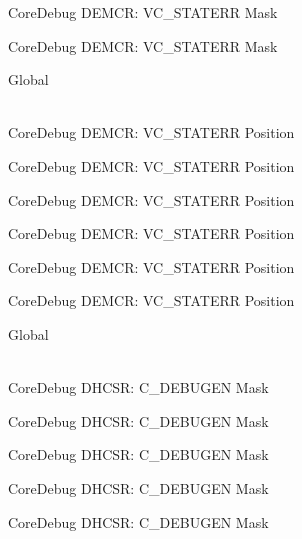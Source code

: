 \begin{DoxyRefList}
\label{deprecated__deprecated000513}%
%
Core\+Debug DEMCR\+: VC\+\_\+\+STATERR Mask 

\label{deprecated__deprecated000615}%
%
Core\+Debug DEMCR\+: VC\+\_\+\+STATERR Mask  
\item[{\parbox[t]{\linewidth}{Global \doxylink{group___c_m_s_i_s___core_debug_ga16f0d3d2ce1e1e8cd762d938ac56c4ac}{Core\+Debug\+\_\+\+DEMCR\+\_\+\+VC\+\_\+\+STATERR\+\_\+\+Pos} }}]\hfill \\
\label{deprecated__deprecated000061}%
%
Core\+Debug DEMCR\+: VC\+\_\+\+STATERR Position 

\label{deprecated__deprecated000205}%
%
Core\+Debug DEMCR\+: VC\+\_\+\+STATERR Position 

\label{deprecated__deprecated000347}%
%
Core\+Debug DEMCR\+: VC\+\_\+\+STATERR Position 

\label{deprecated__deprecated000423}%
%
Core\+Debug DEMCR\+: VC\+\_\+\+STATERR Position 

\label{deprecated__deprecated000512}%
%
Core\+Debug DEMCR\+: VC\+\_\+\+STATERR Position 

\label{deprecated__deprecated000614}%
%
Core\+Debug DEMCR\+: VC\+\_\+\+STATERR Position  
\item[{\parbox[t]{\linewidth}{Global \doxylink{group___c_m_s_i_s___core_debug_gab815c741a4fc2a61988cd2fb7594210b}{Core\+Debug\+\_\+\+DHCSR\+\_\+\+C\+\_\+\+DEBUGEN\+\_\+\+Msk} }}]\hfill \\
\label{deprecated__deprecated000040}%
%
Core\+Debug DHCSR\+: C\+\_\+\+DEBUGEN Mask 

\label{deprecated__deprecated000128}%
%
Core\+Debug DHCSR\+: C\+\_\+\+DEBUGEN Mask 

\label{deprecated__deprecated000184}%
%
Core\+Debug DHCSR\+: C\+\_\+\+DEBUGEN Mask 

\label{deprecated__deprecated000267}%
%
Core\+Debug DHCSR\+: C\+\_\+\+DEBUGEN Mask 

\label{deprecated__deprecated000326}%
%
Core\+Debug DHCSR\+: C\+\_\+\+DEBUGEN Mask 


\end{DoxyRefList}
